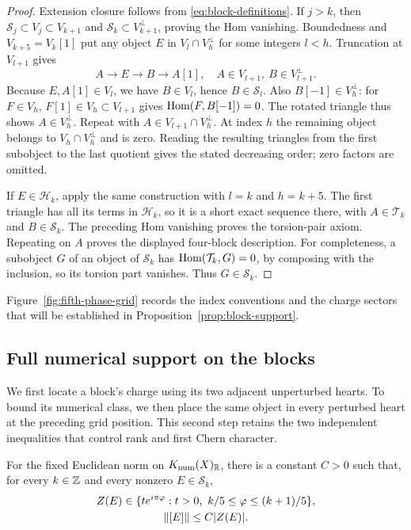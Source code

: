 \begin{proof}
Extension closure follows from \eqref{eq:block-definitions}.  If $j>k$,
then $\mathcal S_j\subset V_j\subset V_{k+1}$ and
$\mathcal S_k\subset V_{k+1}^\perp$, proving the Hom vanishing.
Boundedness and $V_{k+5}=V_k[1]$ put any object $E$ in
$V_l\cap V_h^\perp$ for some integers $l<h$.  Truncation at $V_{l+1}$
gives
\[
 A\longrightarrow E\longrightarrow B\longrightarrow A[1],
 \quad A\in V_{l+1},\ B\in V_{l+1}^\perp.
\]
Because $E,A[1]\in V_l$, we have $B\in V_l$, hence $B\in\mathcal S_l$.
Also $B[-1]\in V_h^\perp$: for $F\in V_h$,
$F[1]\in V_h\subset V_{l+1}$ gives $\operatorname{Hom}(F,B[-1])=0$.
The rotated triangle thus shows $A\in V_h^\perp$.
Repeat with $A\in V_{l+1}\cap V_h^\perp$.  At index $h$ the remaining
object belongs to $V_h\cap V_h^\perp$ and is zero.  Reading the resulting
triangles from the first subobject to the last quotient gives the stated
decreasing order; zero factors are omitted.

If $E\in\mathcal H_k$, apply the same construction with $l=k$ and
$h=k+5$.  The first triangle has all its terms in $\mathcal H_k$, so it is
a short exact sequence there, with $A\in\mathcal T_k$ and
$B\in\mathcal S_k$.  The preceding Hom vanishing proves the torsion-pair
axiom.  Repeating on $A$ proves the displayed four-block description.
For completeness, a subobject $G$ of an object of $\mathcal S_k$ has
$\operatorname{Hom}(\mathcal T_k,G)=0$, by composing with the inclusion, so its torsion
part vanishes.  Thus $G\in\mathcal S_k$.
\end{proof}

Figure~\ref{fig:fifth-phase-grid} records the index conventions and the charge
sectors that will be established in Proposition~\ref{prop:block-support}.


\subsection{Full numerical support on the blocks}

We first locate a block's charge using its two adjacent unperturbed hearts.
To bound its numerical class, we then place the same object in every perturbed
heart at the preceding grid position. This second step retains the two
independent inequalities that control rank and first Chern character.

\begin{proposition}\label{prop:block-support}
For the fixed Euclidean norm on $K_{\mathrm{num}}(X)_\mathbb R$, there is a constant $C>0$
such that, for every $k\in\mathbb Z$ and every nonzero $E\in\mathcal S_k$,
\begin{equation}\label{eq:block-support}
 \begin{gathered}
 Z(E)\in\{t e^{i\pi\varphi}:t>0,\ k/5\le\varphi\le(k+1)/5\},\\
 \left\lVert[E]\right\rVert\le C|Z(E)|.
 \end{gathered}
\end{equation}
\end{proposition}

